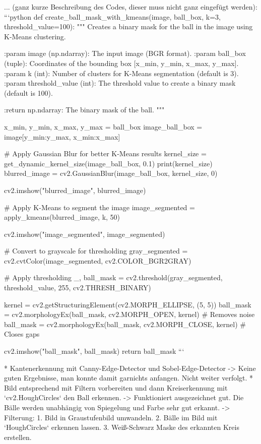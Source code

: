 ... (ganz kurze Beschreibung des Codes, dieser muss nicht ganz eingefügt werden):
```python
def create_ball_mask_with_kmeans(image, ball_box, k=3, threshold_value=100):
    """
    Creates a binary mask for the ball in the image using K-Means clustering.

    :param image (np.ndarray): The input image (BGR format).
    :param ball_box (tuple): Coordinates of the bounding box [x_min, y_min, x_max, y_max].
    :param k (int): Number of clusters for K-Means segmentation (default is 3).
    :param threshold_value (int): The threshold value to create a binary mask (default is 100).

    :return np.ndarray: The binary mask of the ball.
    """

    x_min, y_min, x_max, y_max = ball_box
    image_ball_box = image[y_min:y_max, x_min:x_max]

    # Apply Gaussian Blur for better K-Means results
    kernel_size = get_dynamic_kernel_size(image_ball_box, 0.1)
    print(kernel_size)
    blurred_image = cv2.GaussianBlur(image_ball_box, kernel_size, 0)

    cv2.imshow("blurred_image", blurred_image)

    # Apply K-Means to segment the image
    image_segmented = apply_kmeans(blurred_image, k, 50)

    cv2.imshow("image_segmented", image_segmented)

    # Convert to grayscale for thresholding
    gray_segmented = cv2.cvtColor(image_segmented, cv2.COLOR_BGR2GRAY)

    # Apply thresholding
    _, ball_mask = cv2.threshold(gray_segmented, threshold_value, 255, cv2.THRESH_BINARY)

    kernel = cv2.getStructuringElement(cv2.MORPH_ELLIPSE, (5, 5))
    ball_mask = cv2.morphologyEx(ball_mask, cv2.MORPH_OPEN, kernel)   # Removes noise
    ball_mask = cv2.morphologyEx(ball_mask, cv2.MORPH_CLOSE, kernel)  # Closes gaps

    cv2.imshow("ball_mask", ball_mask)
    return ball_mask
```

* Kantenerkennung mit Canny-Edge-Detector und Sobel-Edge-Detector
    -> Keine guten Ergebnisse, man konnte damit garnichts anfangen. Nicht weiter verfolgt.
* Bild entsprechend mit Filtern vorbereiten und dann Kreiserkennung mit `cv2.HoughCircles` den Ball erkennen.
    -> Funktioniert ausgezeichnet gut. Die Bälle werden unabhängig von Spiegelung und Farbe sehr gut erkannt.
    -> Filterung:
        1. Bild in Graustufenbild umwandeln.
        2. Bälle im Bild mit `HoughCircles` erkennen lassen.
        3. Weiß-Schwarz Maske des erkannten Kreis erstellen.

